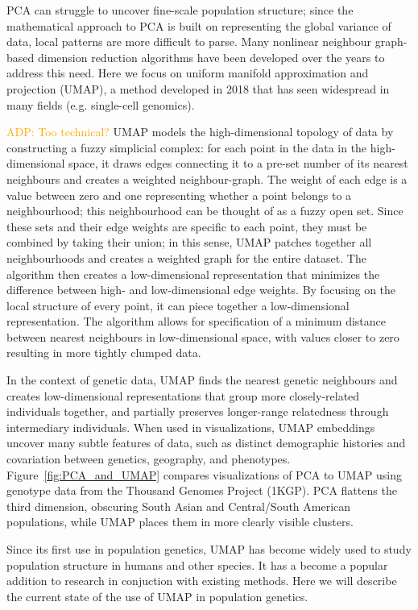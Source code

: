 \documentclass[12pt]{article}
\newcommand{\adpcomment}[1]{{\textcolor{orange}{ADP: #1}}}
\begin{document}
PCA can struggle to uncover fine-scale population structure; since the mathematical approach to PCA is built on representing the global variance of data, local patterns are more difficult to parse. Many nonlinear neighbour graph-based dimension reduction algorithms have been developed over the years to address this need. Here we focus on uniform manifold approximation and projection (UMAP)\cite{mcinnes_umap_2018}, a method developed in 2018 that has seen widespread in many fields (e.g. single-cell genomics\cite{becht_dimensionality_2019}). 

\adpcomment{Too technical?}
UMAP models the high-dimensional topology of data by constructing a fuzzy simplicial complex: for each point in the data in the high-dimensional space, it draws edges connecting it to a pre-set number of its nearest neighbours and creates a weighted neighbour-graph. The weight of each edge is a value between zero and one representing whether a point belongs to a neighbourhood; this neighbourhood can be thought of as a fuzzy open set. Since these sets and their edge weights are specific to each point, they must be combined by taking their union; in this sense, UMAP patches together all neighbourhoods and creates a weighted graph for the entire dataset. The algorithm then creates a low-dimensional representation that minimizes the difference between high- and low-dimensional edge weights. By focusing on the local structure of every point, it can piece together a low-dimensional representation. The algorithm allows for specification of a minimum distance between nearest neighbours in low-dimensional space, with values closer to zero resulting in more tightly clumped data.

In the context of genetic data, UMAP finds the nearest genetic neighbours and creates low-dimensional representations that group more closely-related individuals together, and partially preserves longer-range relatedness through intermediary individuals. When used in visualizations, UMAP embeddings uncover many subtle features of data, such as distinct demographic histories and covariation between genetics, geography, and phenotypes\cite{diaz-papkovich_umap_2019}. Figure~\ref{fig:PCA_and_UMAP} compares visualizations of PCA to UMAP using genotype data from the Thousand Genomes Project (1KGP)\cite{10002015global}. PCA flattens the third dimension, obscuring South Asian and Central/South American populations, while UMAP places them in more clearly visible clusters.

Since its first use in population genetics, UMAP has become widely used to study population structure in humans and other species. It has a become a popular addition to research in conjuction with existing methods. Here we will describe the current state of the use of UMAP in population genetics.
\end{document}
